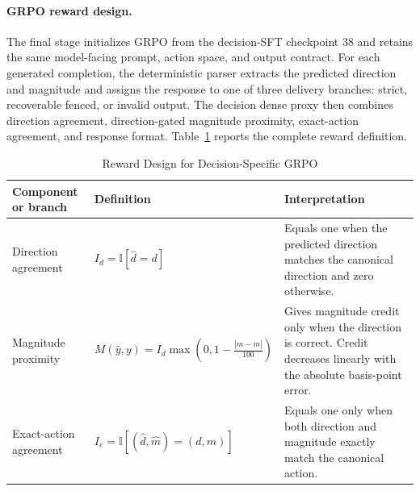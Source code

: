 \paragraph*{GRPO reward design.}

The final stage initializes GRPO from the decision-SFT checkpoint 38 and retains the same model-facing prompt, action space, and output contract. For each generated completion, the deterministic parser extracts the predicted direction and magnitude and assigns the response to one of three delivery branches: strict, recoverable fenced, or invalid output. The decision dense proxy then combines direction agreement, direction-gated magnitude proximity, exact-action agreement, and response format. Table~\ref{tab:chk3-decision-reward-components} reports the complete reward definition.

\begin{table}[htbp]
    \centering
    \footnotesize
    \setlength{\tabcolsep}{5pt}
    \renewcommand{\arraystretch}{1.20}
    \begin{threeparttable}
    \caption{Reward Design for Decision-Specific GRPO}
    \label{tab:chk3-decision-reward-components}
    \begin{tabularx}{\textwidth}{@{}
        >{\raggedright\arraybackslash}p{}
        >{\centering\arraybackslash}p{}
        >{\raggedright\arraybackslash}X
    @{}}
        \toprule
        \textbf{Component or branch}
        & \textbf{Definition}
        & \textbf{Interpretation} \\
        \midrule

        Direction agreement
        &
        \(I_d=\mathbb{I}[\hat d=d]\)
        &
        Equals one when the predicted direction matches the canonical
        direction and zero otherwise. \\

        Magnitude proximity
        &
        \(
        M(\hat y,y)
        =
        I_d\max\!\left(
        0,1-\frac{|\hat m-m|}{100}
        \right)
        \)
        &
        Gives magnitude credit only when the direction is correct. Credit
        decreases linearly with the absolute basis-point error. \\

        Exact-action agreement
        &
        \(
        I_e
        =
        \mathbb{I}
        [(\hat d,\hat m)=(d,m)]
        \)
        &
        Equals one only when both direction and magnitude exactly match the
        canonical action. \\


\end{tabularx}
\end{threeparttable}
\end{table}
